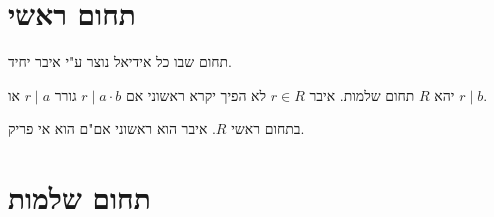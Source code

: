 \documentclass{tstextbook}
\begin{document}
\section{תחום ראשי}

\begin{definition}
תחום שבו כל אידיאל נוצר ע"י איבר יחיד.

\end{definition}
\begin{definition}
יהא \(R\) תחום שלמות. איבר \(r\in R\) לא הפיך יקרא ראשוני אם \(r \mid a\cdot b\) גורר \(r \mid a\) או \(r \mid b\).

\end{definition}
\begin{proposition}
בתחום ראשי \(R\). איבר הוא ראשוני אם"ם הוא אי פריק. 

\end{proposition}
\section{תחום שלמות}
\end{document}
